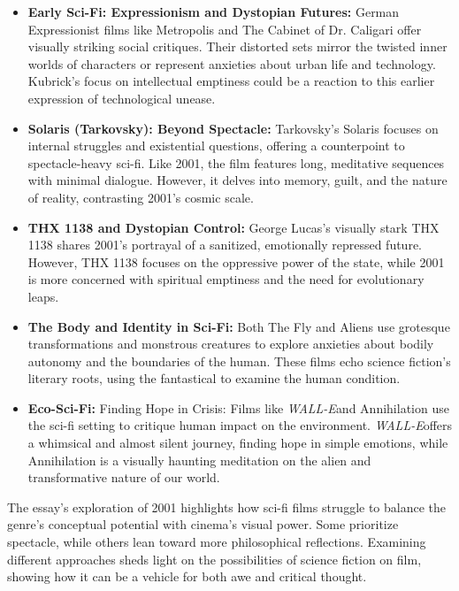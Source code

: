 \documentclass[11pt,fleqn]{book} %
\begin{document}
\begin{itemize}
\item \textbf{Early Sci-Fi: Expressionism and Dystopian Futures:}  German Expressionist films like Metropolis and The Cabinet of Dr. Caligari offer visually striking social critiques. Their distorted sets mirror the twisted inner worlds of characters or represent anxieties about urban life and technology. Kubrick's focus on intellectual emptiness could be a reaction to this earlier expression of technological unease.

\item \textbf{Solaris (Tarkovsky): Beyond Spectacle:}  Tarkovsky's Solaris focuses on internal struggles and existential questions, offering a counterpoint to spectacle-heavy sci-fi. Like 2001, the film features long, meditative sequences with minimal dialogue. However, it delves into memory, guilt, and the nature of reality, contrasting  2001's cosmic scale.

\item \textbf{THX 1138 and Dystopian Control:} George Lucas's visually stark THX 1138 shares 2001's portrayal of a sanitized, emotionally repressed future. However, THX 1138 focuses on the oppressive power of the state, while  2001 is more concerned with spiritual emptiness and the need for evolutionary leaps.

\item \textbf{The Body and Identity in Sci-Fi:} Both The Fly and Aliens use grotesque transformations and monstrous creatures to explore anxieties about bodily autonomy and the boundaries of the human. These films echo science fiction's literary roots, using the fantastical to examine the human condition. 

\item \textbf{Eco-Sci-Fi: }Finding Hope in Crisis: Films like \textit{WALL-E}and Annihilation use the sci-fi setting to critique human impact on the environment. \textit{WALL-E}offers a whimsical and almost silent journey, finding hope in simple emotions, while Annihilation is a visually haunting meditation on the alien and transformative nature of our world.
\end{itemize}

\vspace{5pt}

The essay's exploration of 2001 highlights how sci-fi films struggle to balance the genre's conceptual potential with cinema's visual power.  Some prioritize spectacle, while others lean toward more philosophical reflections. Examining different approaches sheds light on the possibilities of science fiction on film, showing how it can be a vehicle for both awe and critical thought. 
\end{document}
